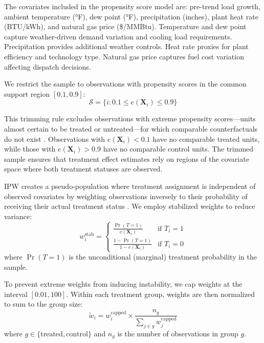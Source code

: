 \documentclass[sigconf,authordraft]{acmart}
\begin{document}
The covariates included in the propensity score model are: pre-trend load growth, ambient temperature (°F), dew point (°F), precipitation (inches), plant heat rate (BTU/kWh), and natural gas price (\$/MMBtu). Temperature and dew point capture weather-driven demand variation and cooling load requirements. Precipitation provides additional weather controls. Heat rate proxies for plant efficiency and technology type. Natural gas price captures fuel cost variation affecting dispatch decisions.

We restrict the sample to observations with propensity scores in the common support region $[0.1, 0.9]$:
\begin{equation}
    \mathcal{S} = \{i : 0.1 \leq e(\mathbf{X}_i) \leq 0.9\}
\end{equation}

This trimming rule excludes observations with extreme propensity scores---units almost certain to be treated or untreated---for which comparable counterfactuals do not exist \citep{crump2009dealing}. Observations with $e(\mathbf{X}_i) < 0.1$ have no comparable treated units, while those with $e(\mathbf{X}_i) > 0.9$ have no comparable control units. The trimmed sample ensures that treatment effect estimates rely on regions of the covariate space where both treatment statuses are observed.

IPW creates a pseudo-population where treatment assignment is independent of observed covariates by weighting observations inversely to their probability of receiving their actual treatment status \citep{hirano2003efficient}. We employ stabilized weights to reduce variance:
\begin{equation}
    w_i^{\text{stab}} = \begin{cases}
        \displaystyle\frac{\Pr(T=1)}{e(\mathbf{X}_i)} & \text{if } T_i = 1 \\[10pt]
        \displaystyle\frac{1 - \Pr(T=1)}{1 - e(\mathbf{X}_i)} & \text{if } T_i = 0
    \end{cases}
\end{equation}
where $\Pr(T=1)$ is the unconditional (marginal) treatment probability in the sample.

To prevent extreme weights from inducing instability, we cap weights at the interval $[0.01, 100]$. Within each treatment group, weights are then normalized to sum to the group size:
\begin{equation}
    \tilde{w}_i = w_i^{\text{capped}} \times \frac{n_g}{\sum_{j \in g} w_j^{\text{capped}}}
\end{equation}
where $g \in \{\text{treated}, \text{control}\}$ and $n_g$ is the number of observations in group $g$.
\end{document}

